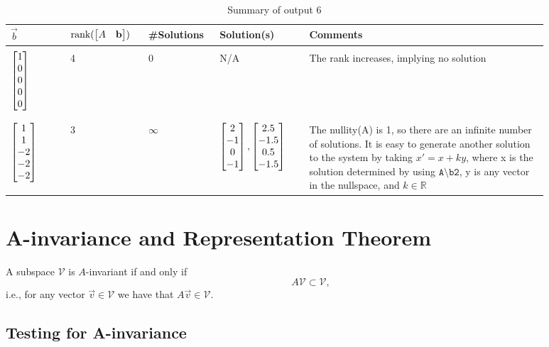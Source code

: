 \documentclass[10pt]{article}
\begin{document}
\begin{table}[h]
    \centering
    \begin{tabular}{|p{0.1\linewidth}|p{0.13\linewidth}|p{0.1\linewidth}|p{0.15\linewidth}|p{0.4\linewidth}|}
        \hline
        $\vec{b}$ & $\text{rank}(\begin{bmatrix} A & \mathbf{b} \end{bmatrix})$ & \#Solutions & Solution(s) & Comments \\ \hline & & & & \\
        $\begin{bmatrix} 1\\0\\0\\0\\0 \end{bmatrix}$ & 4 & 0 & N/A & The rank increases, implying no solution\\ & & & & \\ \hline & & & & \\
        $\begin{bmatrix} 1\\1\\-2\\-2\\-2 \end{bmatrix}$ & 3 & $\infty$ & $\begin{bmatrix} 2\\-1\\0\\-1 \end{bmatrix}, \begin{bmatrix} 2.5\\-1.5\\0.5\\-1.5 \end{bmatrix}$ & \vspace{-1cm}The nullity(A) is 1, so there are an infinite number of solutions. It is easy to generate another solution to the system by taking $x' = x + ky$, where x is the solution determined by using $\texttt{A\textbackslash b2}$, y is any vector in the nullspace, and $k \in \mathbb{R}$ \vspace{0.4cm} \\ \hline
    \end{tabular}
    \caption{Summary of output 6}
    \label{tab:my_label}
\end{table}

\section{A-invariance and Representation Theorem}
A subspace $\mathcal{V}$ is $A$-invariant if and only if
\[
    A\mathcal{V} \subset \mathcal{V},
\]
i.e., for any vector $\vec{v} \in \mathcal{V}$ we have that $A\vec{v} \in \mathcal{V}$.

\subsection{Testing for A-invariance}
\end{document}
